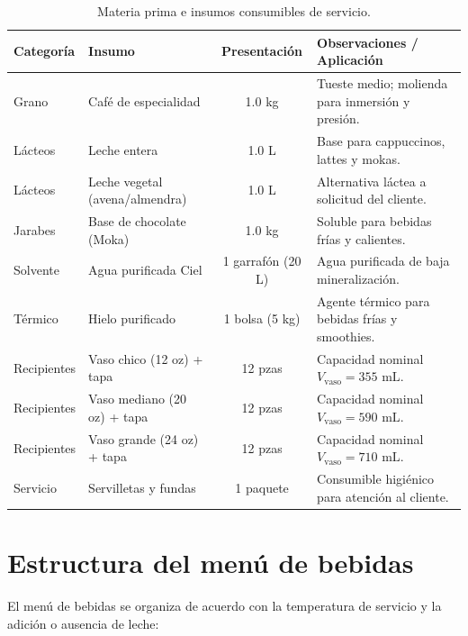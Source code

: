 \documentclass{article}
\begin{document}
\begin{table}[H]
	\centering
	\caption{Materia prima e insumos consumibles de servicio.}
	\label{tab:materia_prima_insumos}
	\vspace{6pt}
	\begin{tabular}{llcp{6.0cm}}
		\toprule
		\textbf{Categoría} & \textbf{Insumo} & \textbf{Presentación} & \textbf{Observaciones / Aplicación} \\
		\midrule
		Grano & Café de especialidad & 1.0 kg & Tueste medio; molienda para inmersión y presión. \\
		Lácteos & Leche entera & 1.0 L & Base para cappuccinos, lattes y mokas. \\
		Lácteos & Leche vegetal (avena/almendra) & 1.0 L & Alternativa láctea a solicitud del cliente. \\
		Jarabes & Base de chocolate (Moka) & 1.0 kg & Soluble para bebidas frías y calientes. \\
		Solvente & Agua purificada Ciel & 1 garrafón (20 L) & Agua purificada de baja mineralización. \\
		Térmico & Hielo purificado & 1 bolsa (5 kg) & Agente térmico para bebidas frías y smoothies. \\
		Recipientes & Vaso chico (12 oz) + tapa & 12 pzas & Capacidad nominal $V_{\text{vaso}} = 355\text{ mL}$. \\
		Recipientes & Vaso mediano (20 oz) + tapa & 12 pzas & Capacidad nominal $V_{\text{vaso}} = 590\text{ mL}$. \\
		Recipientes & Vaso grande (24 oz) + tapa & 12 pzas & Capacidad nominal $V_{\text{vaso}} = 710\text{ mL}$. \\
		Servicio & Servilletas y fundas & 1 paquete & Consumible higiénico para atención al cliente. \\
		\bottomrule
	\end{tabular}
\end{table}

\section{Estructura del menú de bebidas}

El menú de bebidas se organiza de acuerdo con la temperatura de servicio y la adición o ausencia de leche:
\end{document}

